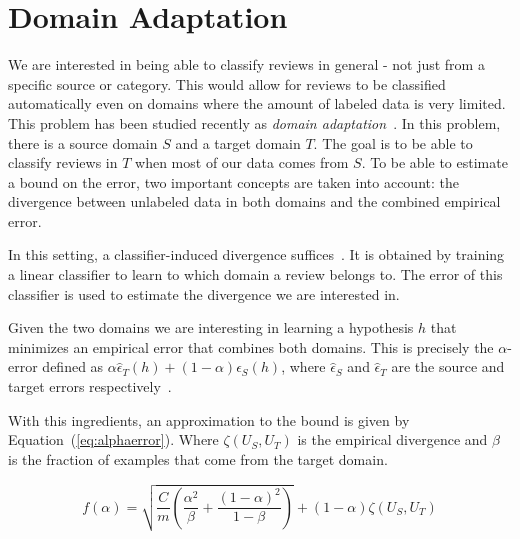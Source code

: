 \documentclass[letterpaper]{article}
\begin{document}
\section{Domain Adaptation}
\label{sec:background}

We are interested in being able to classify reviews in general - not
just from a specific source or category. This would allow for reviews
to be classified automatically even on domains where the amount of
labeled data is very limited. This problem has been studied recently
as \emph{domain adaptation}~\cite{JennLearnDiffDomains}. In this
problem, there is a source domain $S$ and a target domain $T$. The
goal is to be able to classify reviews in $T$ when most of our data
comes from $S$. To be able to estimate a bound on the error, two
important concepts are taken into account: the divergence between
unlabeled data in both domains and the combined empirical error.

In this setting, a classifier-induced divergence
suffices~\cite{JennLearnDiffDomains}. It is obtained by training a
linear classifier to learn to which domain a review belongs to. The
error of this classifier is used to estimate the divergence we are
interested in.

Given the two domains we are interesting in learning a hypothesis $h$
that minimizes an empirical error that combines both domains. This is
precisely the $\alpha$-error defined as $\alpha \hat
\epsilon_T(h)+(1-\alpha)\hat \epsilon_S(h)$, where $\hat \epsilon_S$
and $\hat \epsilon_T$ are the source and target errors
respectively~\cite{JennLearnDiffDomains}.

With this ingredients, an approximation to the bound is given by
Equation~(\ref{eq:alphaerror}). Where $\zeta(U_S,U_T)$ is the
empirical divergence and $\beta$ is the fraction of examples that come
from the target domain.

\begin{equation}
  \label{eq:alphaerror}
  f(\alpha)=\sqrt{\frac{C}{m}\left(\frac{\alpha^2}{\beta} + \frac{(1-\alpha)^2}{1-\beta}\right)}+(1-\alpha)\zeta(U_S,U_T)
\end{equation}
\end{document}
